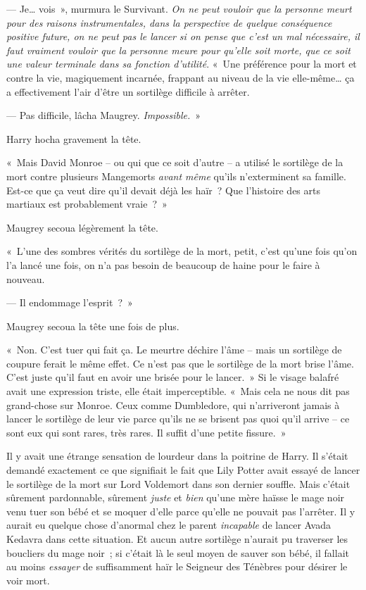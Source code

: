 --- Je… vois~», murmura le Survivant. \emph{On ne peut vouloir que la personne meurt pour des raisons instrumentales, dans la perspective de quelque conséquence positive future, on ne peut pas le lancer si on pense que c'est un mal nécessaire, il faut vraiment vouloir que la personne meure pour qu'elle soit morte, que ce soit une valeur terminale dans sa fonction d'utilité}. «~Une préférence pour la mort et contre la vie, magiquement incarnée, frappant au niveau de la vie elle-même… ça a effectivement l'air d'être un sortilège difficile à arrêter.

--- Pas difficile, lâcha Maugrey. \emph{Impossible.}~»

Harry hocha gravement la tête.

«~Mais David Monroe -- ou qui que ce soit d'autre -- a utilisé le sortilège de la mort contre plusieurs Mangemorts \emph{avant même} qu'ils n'exterminent sa famille. Est-ce que ça veut dire qu'il devait déjà les haïr~? Que l'histoire des arts martiaux est probablement vraie~?~»

Maugrey secoua légèrement la tête.

«~L'une des sombres vérités du sortilège de la mort, petit, c'est qu'une fois qu'on l'a lancé une fois, on n'a pas besoin de beaucoup de haine pour le faire à nouveau.

--- Il endommage l'esprit~?~»

Maugrey secoua la tête une fois de plus.

«~Non. C'est tuer qui fait ça. Le meurtre déchire l'âme -- mais un sortilège de coupure ferait le même effet. Ce n'est pas que le sortilège de la mort brise l'âme. C'est juste qu'il faut en avoir une brisée pour le lancer.~» Si le visage balafré avait une expression triste, elle était imperceptible. «~Mais cela ne nous dit pas grand-chose sur Monroe. Ceux comme Dumbledore, qui n'arriveront jamais à lancer le sortilège de leur vie parce qu'ils ne se brisent pas quoi qu'il arrive -- ce sont eux qui sont rares, très rares. Il suffit d'une petite fissure.~»

Il y avait une étrange sensation de lourdeur dans la poitrine de Harry. Il s'était demandé exactement ce que signifiait le fait que Lily Potter avait essayé de lancer le sortilège de la mort sur Lord Voldemort dans son dernier souffle. Mais c'était sûrement pardonnable, sûrement \emph{juste} et \emph{bien} qu'une mère haïsse le mage noir venu tuer son bébé et se moquer d'elle parce qu'elle ne pouvait pas l'arrêter. Il y aurait eu quelque chose d'anormal chez le parent \emph{incapable} de lancer Avada Kedavra dans cette situation. Et aucun autre sortilège n'aurait pu traverser les boucliers du mage noir~; si c'était là le seul moyen de sauver son bébé, il fallait au moins \emph{essayer} de suffisamment haïr le Seigneur des Ténèbres pour désirer le voir mort.


